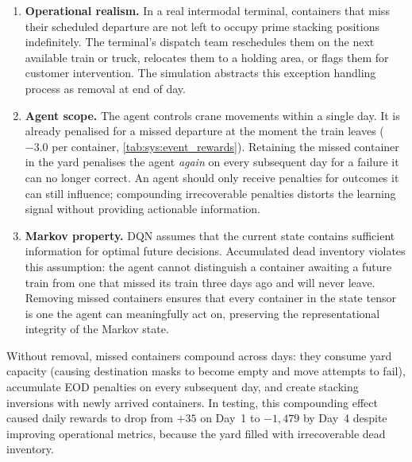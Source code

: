 \begin{enumerate}
  \item \textbf{Operational realism.}
    In a real intermodal terminal, containers that miss their scheduled departure are not left to occupy prime stacking positions indefinitely.
    The terminal's dispatch team reschedules them on the next available train or truck, relocates them to a holding area, or flags them for customer intervention.
    The simulation abstracts this exception handling process as removal at end of day.

  \item \textbf{Agent scope.}
    The agent controls crane movements within a single day.
    It is already penalised for a missed departure at the moment the train leaves ($-3.0$ per container, \cref{tab:sys:event_rewards}).
    Retaining the missed container in the yard penalises the agent \emph{again} on every subsequent day for a failure it can no longer correct.
    An agent should only receive penalties for outcomes it can still influence; compounding irrecoverable penalties distorts the learning signal without providing actionable information.

  \item \textbf{Markov property.}
    DQN assumes that the current state contains sufficient information for optimal future decisions.
    Accumulated dead inventory violates this assumption: the agent cannot distinguish a container awaiting a future train from one that missed its train three days ago and will never leave.
    Removing missed containers ensures that every container in the state tensor is one the agent can meaningfully act on, preserving the representational integrity of the Markov state.
\end{enumerate}

Without removal, missed containers compound across days: they consume yard capacity (causing destination masks to become empty and move attempts to fail), accumulate EOD penalties on every subsequent day, and create stacking inversions with newly arrived containers.
In testing, this compounding effect caused daily rewards to drop from $+35$ on Day~1 to $-1{,}479$ by Day~4 despite improving operational metrics, because the yard filled with irrecoverable dead inventory.
